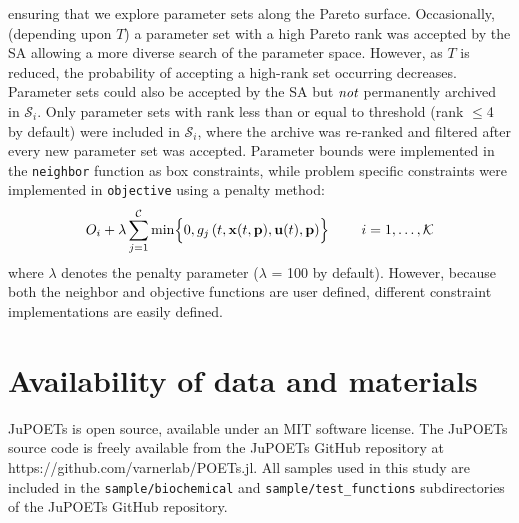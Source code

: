 \documentclass{bmcart}
\begin{document}
ensuring that we explore parameter sets along the Pareto surface.
Occasionally, (depending upon $T$) a parameter set with a high Pareto rank was accepted by the SA allowing a more diverse search of the parameter space.
However, as $T$ is reduced, the probability of accepting a high-rank set occurring decreases.
Parameter sets could also be accepted by the SA but $\emph{not}$ permanently archived in $\mathcal{S}_{i}$.
Only parameter sets with rank less than or equal to threshold (rank $\leq$4 by default) were included in $\mathcal{S}_{i}$, where the archive was re-ranked and filtered after
every new parameter set was accepted.
Parameter bounds were implemented in the \texttt{neighbor} function as box constraints, while problem specific constraints were implemented in \texttt{objective} using a penalty method:
\begin{equation}
  O_{i}+\lambda\sum_{j=1}^{\mathcal{C}}\min\Bigl\{0,g_j\left(t,\mathbf{x}(t,\mathbf{p}),\mathbf{u}(t),\mathbf{p}\right)\Bigr\}\qquad~i=1,\hdots,\mathcal{K}
\end{equation}where $\lambda$ denotes the penalty parameter ($\lambda$ = 100 by default).
However, because both the neighbor and objective functions are user defined, different constraint implementations are easily defined.

\section*{Availability of data and materials}
JuPOETs is open source, available under an MIT software license.
The JuPOETs source code is freely available from the JuPOETs GitHub repository at https://github.com/varnerlab/POETs.jl.
All samples used in this study are included in the \texttt{sample/biochemical} and \texttt{sample/test\_functions} subdirectories of the JuPOETs GitHub repository.
\end{document}
